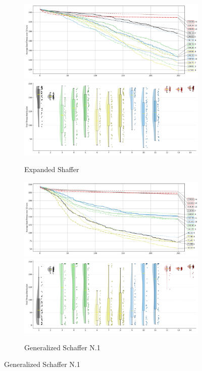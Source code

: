 \begin{figure}[p]\ContinuedFloat
\renewcommand\thesubfigure{C.\arabic{figure}.\arabic{subfigure}} %

    \centering

\begin{subfigure}{1\textwidth}
    \centering
    \includegraphics[width=.49\textwidth]{Figures/results/500/Expanded_Shaffer_All_selected_algorithms_dim500_annot_legend.png}
    \includegraphics[width=.49\textwidth]{Figures/results/500/Expanded_Shaffer_all_dim500_raincloud_vertical.png}
    \caption{Expanded Shaffer}
\end{subfigure}

\begin{subfigure}{1\textwidth}
    \centering
    \includegraphics[width=.49\textwidth]{Figures/results/500/Generalized_Schaffer_N1_All_selected_algorithms_dim500_annot_legend.png}
    \includegraphics[width=.49\textwidth]{Figures/results/500/Generalized_Schaffer_N1_all_dim500_raincloud_vertical.png}
    \caption{Generalized Schaffer N.1}
\end{subfigure}


\end{figure}

